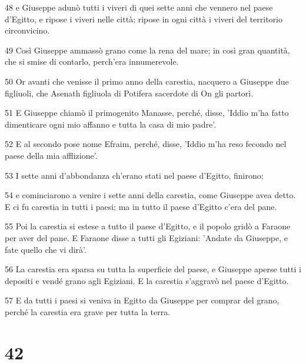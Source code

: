 \par 48 e Giuseppe adunò tutti i viveri di quei sette anni che vennero nel paese d'Egitto, e ripose i viveri nelle città; ripose in ogni città i viveri del territorio circonvicino.
\par 49 Così Giuseppe ammassò grano come la rena del mare; in così gran quantità, che si smise di contarlo, perch'era innumerevole.
\par 50 Or avanti che venisse il primo anno della carestia, nacquero a Giuseppe due figliuoli, che Asenath figliuola di Potifera sacerdote di On gli partorì.
\par 51 E Giuseppe chiamò il primogenito Manasse, perché, disse, 'Iddio m'ha fatto dimenticare ogni mio affanno e tutta la casa di mio padre'.
\par 52 E al secondo pose nome Efraim, perché, disse, 'Iddio m'ha reso fecondo nel paese della mia afflizione'.
\par 53 I sette anni d'abbondanza ch'erano stati nel paese d'Egitto, finirono;
\par 54 e cominciarono a venire i sette anni della carestia, come Giuseppe avea detto. E ci fu carestia in tutti i paesi; ma in tutto il paese d'Egitto c'era del pane.
\par 55 Poi la carestia si estese a tutto il paese d'Egitto, e il popolo gridò a Faraone per aver del pane. E Faraone disse a tutti gli Egiziani: 'Andate da Giuseppe, e fate quello che vi dirà'.
\par 56 La carestia era sparsa su tutta la superficie del paese, e Giuseppe aperse tutti i depositi e vendé grano agli Egiziani. E la carestia s'aggravò nel paese d'Egitto.
\par 57 E da tutti i paesi si veniva in Egitto da Giuseppe per comprar del grano, perché la carestia era grave per tutta la terra.

\chapter{42}

